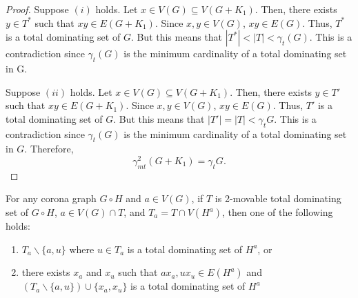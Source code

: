 \documentclass[twoside,12pt]{article}
\begin{document}
\begin{proof}
	Suppose $(i)$ holds. Let $x \in V(G) \subseteq V(G+K_1)$. Then, there exists $y \in T^*$ such that $xy \in E(G+K_1)$. Since $x, y \in V(G)$, $xy \in E(G)$. Thus, $T^*$ is a total dominating set of $G$. But this means that $|T^*| < |T| < \gamma_t (G)$. This is a contradiction since $\gamma_t (G)$ is the minimum cardinality of a total dominating set in G.
	
	Suppose $(ii)$ holds. Let $x \in V(G) \subseteq V(G+K_1)$. Then, there exists $y \in T'$ such that $xy \in E(G+K_1)$. Since $x,y \in V(G)$, $xy \in E(G)$. Thus, $T'$ is a total dominating set of $G$. But this means that $|T'|=|T| < \gamma_t G$. This is a contradiction since $\gamma_t (G)$ is the minimum cardinality of a total dominating set in $G$. Therefore, $$\gamma_{mt}^2 (G+K_1) = \gamma_t G.$$
\end{proof}

\begin{lemma}\rm\label{Lem:2}
	For any corona graph $G \circ H$ and $a \in V(G)$, if $T$ is 2-movable total dominating set of $G \circ H$, $a \in V(G) \cap T$, and $T_a = T \cap V(H^a)$, then one of the following holds:
	\begin{enumerate}
		\item[(i)] $T_a \backslash \{a,u\}$ where $u \in T_a$ is a total dominating set of $H^a$, or
		\item[(ii)] there exists $x_a$ and $x_u$ such that $ax_a, ux_u \in E(H^a)$ and $(T_a \backslash \{a,u\}) \cup \{x_a, x_u\}$ is a total dominating set of $H^a$
	\end{enumerate}
\end{lemma}
\end{document}
